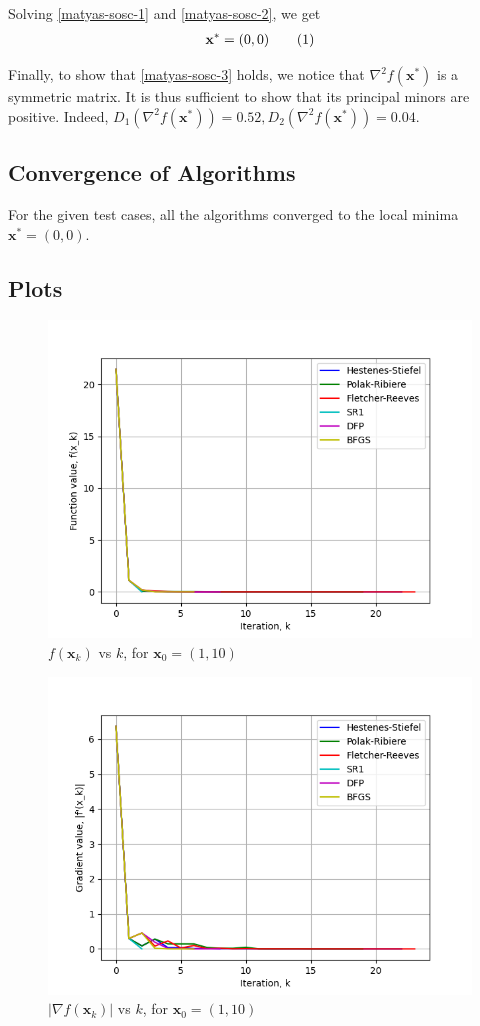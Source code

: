 \documentclass[a4paper]{article}
\newcommand\numberthis{\addtocounter{equation}{1}\tag{\theequation}}
\begin{document}
Solving \eqref{matyas-sosc-1} and \eqref{matyas-sosc-2}, we get
\begin{align*}
    \textbf{x}^* = (0, 0) \numberthis \label{matyas-sosc-4}
\end{align*}

Finally, to show that \eqref{matyas-sosc-3} holds, we notice that $\nabla^2 f(\textbf{x}^*)$ is a symmetric matrix. It is thus sufficient to show that its principal minors are positive. Indeed, $D_1(\nabla^2 f(\textbf{x}^*)) = 0.52, D_2(\nabla^2 f(\textbf{x}^*)) = 0.04$.

\subsection{Convergence of Algorithms}

For the given test cases, all the algorithms converged to the local minima $\textbf{x}^* = (0, 0)$.

\subsection{Plots}

\begin{figure}[H]
    \centering
    \includegraphics[width=.65\textwidth]{images/matyas_function_vals.png}
    \caption{$f(\textbf{x}_k)$ vs $k$, for $\textbf{x}_0 = (1, 10)$}
\end{figure}

\begin{figure}[H]
    \centering
    \includegraphics[width=.65\textwidth]{images/matyas_function_grad.png}
    \caption{$|\nabla f(\textbf{x}_k)|$ vs $k$, for $\textbf{x}_0 = (1, 10)$}
\end{figure}
\end{document}

